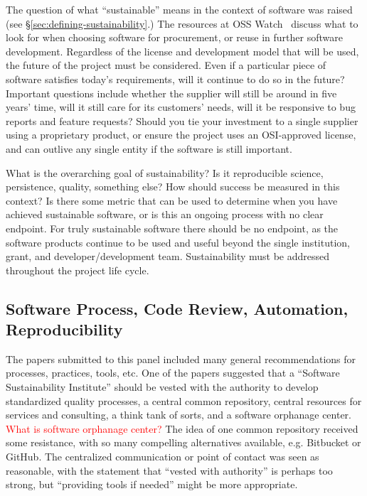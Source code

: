 \documentclass[11pt, oneside]{amsart}
\newcommand{\note}[1]{ {\textcolor{red}    { #1 }}}
\begin{document}
The question of what ``sustainable'' means in the context of software was
raised (see \S\ref{sec:defining-sustainability}.) The resources at OSS Watch~\cite{osswatch-web}   discuss what
to look for when choosing software for procurement, or reuse in further software
development. Regardless of the license and development model that will be used,
the future of the project must be considered. Even if a particular piece of
software satisfies today's requirements, will it continue to do so in the
future? Important questions include whether the supplier will still be around in five
years' time, will it still care for its customers' needs, will it be responsive to
bug reports and feature requests? Should you tie your investment to a single
supplier using a proprietary product, or ensure the project uses an OSI-approved
license, and can outlive any single entity if the software is still important.

What is the overarching goal of sustainability? Is it reproducible science,
persistence, quality, something else? How should success be measured in this
context? Is there some metric that can be used to determine when you have
achieved sustainable software, or is this an ongoing process with no clear
endpoint. For truly sustainable software there should be no endpoint, as the
software products continue to be used and useful beyond the single institution,
grant, and developer/development team. Sustainability must be addressed
throughout the project life cycle.

\subsection{Software Process, Code Review, Automation, Reproducibility}

The papers submitted to this panel included many general
recommendations for processes, practices, tools, etc. One of the papers
suggested that a ``Software Sustainability Institute'' should be vested with
the authority to develop standardized quality processes, a central common
repository, central resources for services and consulting, a think tank of
sorts, and a software orphanage center. \note{What is software orphanage center?} The idea of one common repository received
some resistance, with so many compelling alternatives available, e.g. Bitbucket or
GitHub. The centralized communication or point of contact was seen as
reasonable, with the statement that ``vested with authority'' is perhaps too strong,
but ``providing tools if needed'' might be more appropriate.
\end{document}
